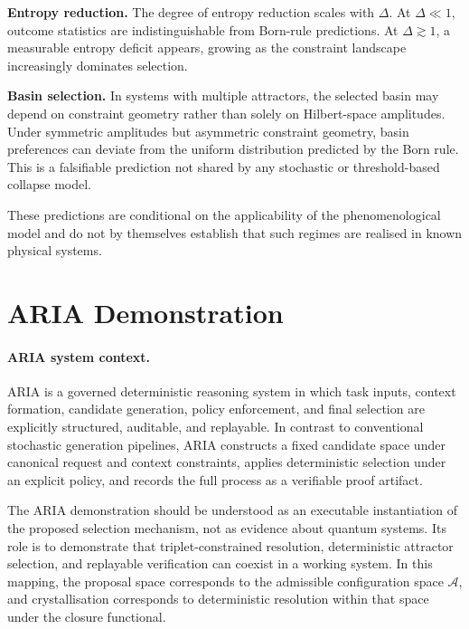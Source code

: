 \documentclass[12pt]{article}
\begin{document}
\textbf{Entropy reduction.} The degree of entropy reduction scales with $\Delta$. At $\Delta \ll 1$, outcome statistics are indistinguishable from Born-rule predictions. At $\Delta \gtrsim 1$, a measurable entropy deficit appears, growing as the constraint landscape increasingly dominates selection.

\textbf{Basin selection.} In systems with multiple attractors, the selected basin may depend on constraint geometry rather than solely on Hilbert-space amplitudes. Under symmetric amplitudes but asymmetric constraint geometry, basin preferences can deviate from the uniform distribution predicted by the Born rule. This is a falsifiable prediction not shared by any stochastic or threshold-based collapse model.

These predictions are conditional on the applicability of the phenomenological model and do not by themselves establish that such regimes are realised in known physical systems.

\section{ARIA Demonstration}\label{sec:aria}

\paragraph{ARIA system context.}
ARIA is a governed deterministic reasoning system in which task inputs, context formation, candidate generation, policy enforcement, and final selection are explicitly structured, auditable, and replayable. In contrast to conventional stochastic generation pipelines, ARIA constructs a fixed candidate space under canonical request and context constraints, applies deterministic selection under an explicit policy, and records the full process as a verifiable proof artifact.

The ARIA demonstration should be understood as an executable instantiation of the proposed selection mechanism, not as evidence about quantum systems. Its role is to demonstrate that triplet-constrained resolution, deterministic attractor selection, and replayable verification can coexist in a working system. In this mapping, the proposal space corresponds to the admissible configuration space $\mathcal{A}$, and crystallisation corresponds to deterministic resolution within that space under the closure functional.
\end{document}
